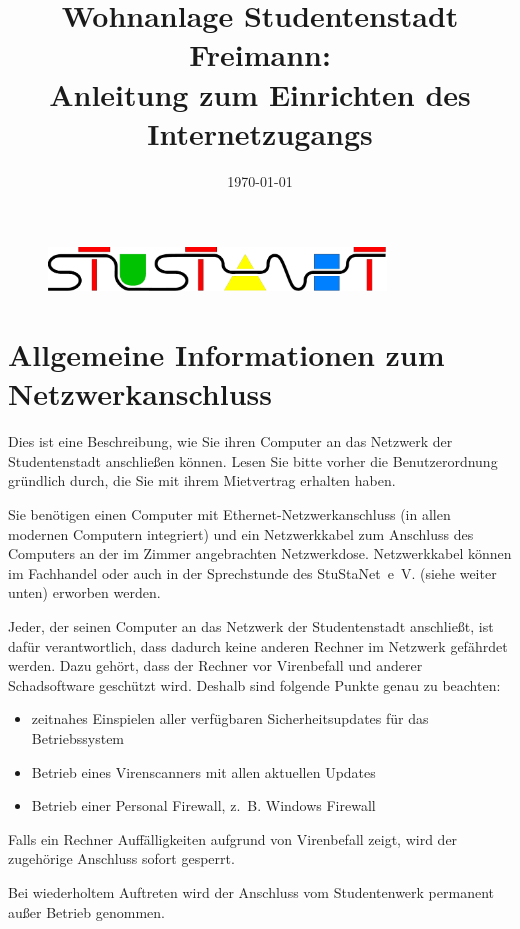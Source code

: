 \documentclass[a4paper,12pt,draft]{scrartcl}
\title{Wohnanlage Studentenstadt Freimann:\\
       Anleitung zum Einrichten des Internetzugangs}
\date{\today}
\begin{document}
\maketitle

\begin{figure}[t!]
   \centering
   \vspace{-20pt}
   \includegraphics[width=0.8\textwidth,keepaspectratio]{Bilder/stunetp}
   \vspace{-20pt}
\end{figure}

\section*{Allgemeine Informationen zum Netzwerkanschluss}

Dies ist eine Beschreibung, wie Sie ihren Computer an das Netzwerk der Studentenstadt anschließen können. Lesen Sie bitte vorher die Benutzerordnung gründlich durch, die Sie mit ihrem Mietvertrag erhalten haben.

Sie benötigen einen Computer mit Ethernet-Netzwerkanschluss (in allen modernen Computern integriert) und ein Netzwerkkabel zum Anschluss des Computers an der im Zimmer angebrachten Netzwerkdose. Netzwerkkabel können im Fachhandel oder auch in der Sprechstunde des StuStaNet~e~V. (siehe weiter unten) erworben werden.

Jeder, der seinen Computer an das Netzwerk der Studentenstadt anschließt, ist dafür verantwortlich, dass dadurch keine anderen Rechner im Netzwerk gefährdet werden. Dazu gehört, dass der Rechner vor Virenbefall und anderer Schadsoftware geschützt wird. Deshalb sind folgende Punkte genau zu beachten:
\begin{itemize}
    \item zeitnahes Einspielen aller verfügbaren Sicherheitsupdates für das Betriebssystem
    \item Betrieb eines Virenscanners mit allen aktuellen Updates
    \item Betrieb einer Personal Firewall, z.~B. Windows Firewall
\end{itemize}
Falls ein Rechner Auffälligkeiten aufgrund von Virenbefall zeigt, wird der zugehörige Anschluss sofort gesperrt.

\begin{em}
Bei wiederholtem Auftreten wird der Anschluss vom Studentenwerk permanent außer Betrieb genommen.
\end{em}
\end{document}
